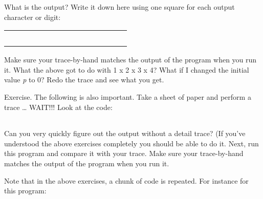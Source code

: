 \documentclass[
]{article}
\begin{document}
What is the output? Write it down here using one square for each output
character or digit:

\begin{longtable}[]{@{}lllllllllllllll@{}}
\toprule
\endhead
& & & & & & & & & & & & & &\tabularnewline
& & & & & & & & & & & & & &\tabularnewline
& & & & & & & & & & & & & &\tabularnewline
& & & & & & & & & & & & & &\tabularnewline
& & & & & & & & & & & & & &\tabularnewline
\bottomrule
\end{longtable}

Make sure your trace-by-hand matches the output of the program when you
run it. What the above got to do with 1 x 2 x 3 x 4? What if I changed
the initial value \emph{p} to 0? Redo the trace and see what you get.

Exercise. The following is also important. Take a sheet of paper and
perform a trace \ldots{} WAIT!!! Look at the code:

\begin{longtable}[]{@{}@{}}
\toprule
\endhead
\bottomrule
\end{longtable}

Can you very quickly figure out the output without a detail trace? (If
you've understood the above exercises completely you should be able to
do it. Next, run this program and compare it with your trace. Make sure
your trace-by-hand matches the output of the program when you run it.

Note that in the above exercises, a chunk of code is repeated. For
instance for this program:
\end{document}
